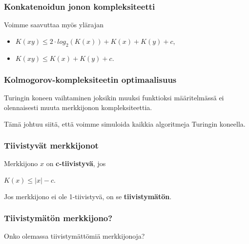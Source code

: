\documentclass{beamer}
\newcommand{\bol}{\protect\textbf}
\begin{document}
   \begin{frame}
    \frametitle{Konkatenoidun jonon kompleksiteetti}
   
   \Large Voimme saavuttaa my{\"o}s yl{\"a}rajan 
   
   	\begin{itemize}
		\item $K(xy) \le 2\cdot log_{2}(K(x)) + K(x) + K(y) + c$,
	\end{itemize}
	
	
	\begin{itemize}
		\item<2-> $K(xy) \le K(x) + K(y) + c$.
	\end{itemize}
   \end{frame}    
    
   \begin{frame}
    \frametitle{Kolmogorov-kompleksiteetin optimaalisuus}
    
    \Large Turingin koneen vaihtaminen joksikin muuksi funktioksi m{\"a}{\"a}ritelm{\"a}ss{\"a} ei olennaisesti muuta merkkijonon kompleksiteettia.
    
    \vspace{8mm}
    
    T{\"a}m{\"a} johtuu siit{\"a}, ett{\"a} voimme simuloida kaikkia algoritmeja Turingin koneella.
    
   \end{frame}    
   
   \begin{frame}
    \frametitle{Tiivistyv{\"a}t merkkijonot}
    
    \Large Merkkijono $x$ on \bol{c-tiivistyv{\"a}}, jos
    	\begin{center}
    		$K(x) \leq |x| - c$.
    	\end{center}
    	
    Jos merkkijono ei ole 1-tiivistyv{\"a}, on se \bol{tiivistym{\"a}t{\"o}n}.
   
   \end{frame}  
   
   \begin{frame}
    \frametitle{Tiivistym{\"a}t{\"o}n merkkijono?}
    
    \Large Onko olemassa tiivistym{\"a}tt{\"o}mi{\"a} merkkijonoja?
    
    \vspace{3mm}

	\vspace{3mm}
   
   \end{frame}
     
\end{document}

